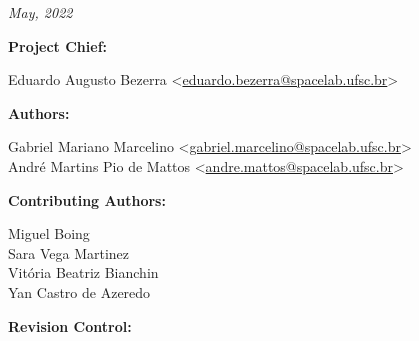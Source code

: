 %
%
%
%
%

%
%
%
%
%

\thispagestyle{empty}

\begin{center}

\textbf{\thetitle}

\textit{May, 2022}

\vspace{1cm}

\textbf{Project Chief:}

Eduardo Augusto Bezerra <\href{mailto:eduardo.bezerra@spacelab.ufsc.br}{eduardo.bezerra@spacelab.ufsc.br}>

\vspace{1cm}

\textbf{Authors:}

Gabriel Mariano Marcelino <\href{mailto:gabriel.marcelino@spacelab.ufsc.br}{gabriel.marcelino@spacelab.ufsc.br}> \\
André Martins Pio de Mattos <\href{mailto:andre.mattos@spacelab.ufsc.br}{andre.mattos@spacelab.ufsc.br}> \\

\vspace{1cm}

\textbf{Contributing Authors:}

Miguel Boing \\
Sara Vega Martinez \\
Vitória Beatriz Bianchin \\
Yan Castro de Azeredo \\

\vspace{1cm}


\textbf{Revision Control:}

\end{center}

